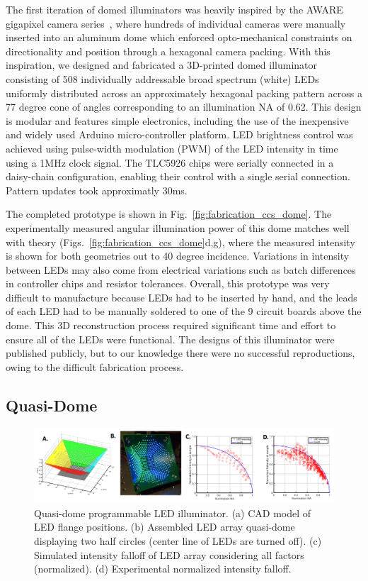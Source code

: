 The first iteration of domed illuminators was heavily inspired by the AWARE gigapixel camera series~\cite{brady2012multiscale, marks2014characterization, llull2015characterization}, where hundreds of individual cameras were manually inserted into an aluminum dome which enforced opto-mechanical constraints on directionality and position through a hexagonal camera packing. With this inspiration, we designed and fabricated a 3D-printed domed illuminator consisting of 508 individually addressable broad spectrum (white) LEDs uniformly distributed across an approximately hexagonal packing pattern across a 77 degree cone of angles corresponding to an illumination NA of 0.62. This design is modular and features simple electronics, including the use of the inexpensive and widely used Arduino micro-controller platform. LED brightness control was achieved using pulse-width modulation (PWM) of the LED intensity in time using a 1MHz clock signal. The TLC5926 chips were serially connected in a daisy-chain configuration, enabling their control with a single serial connection. Pattern updates took approximatly 30ms.

The completed prototype is shown in Fig.~\ref{fig:fabrication_ccs_dome}. The experimentally measured angular illumination power of this dome matches well with theory (Figs.~\ref{fig:fabrication_ccs_dome}d,g), where the measured intensity is shown for both geometries out to 40 degree incidence. Variations in intensity between LEDs may also come from electrical variations such as batch differences in controller chips and resistor tolerances. Overall, this prototype was very difficult to manufacture because LEDs had to be inserted by hand, and the leads of each LED had to be manually soldered to one of the 9 circuit boards above the dome. This 3D reconstruction process required significant time and effort to ensure all of the LEDs were functional. The designs of this illuminator were published publicly, but to our knowledge there were no successful reproductions, owing to the difficult fabrication process.

\subsection{Quasi-Dome}\label{sec:fabrication:quasidome}

\begin{figure}
    \centering
    \includegraphics[width=\textwidth]{figures/fig_qdome_main.png}
    \caption{Quasi-dome programmable LED illuminator. (a) CAD model of LED flange positions. (b) Assembled LED array quasi-dome displaying two half circles (center line of LEDs are turned off). (c) Simulated intensity falloff of LED array considering all factors (normalized). (d) Experimental normalized intensity falloff.}\label{fig:fabrication:fig_fabrication_quasi_dome}
\end{figure}

